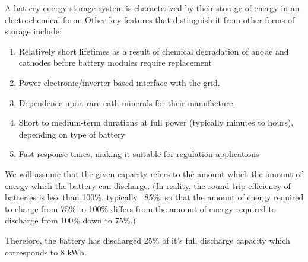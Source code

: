 \documentclass{homework}
\begin{document}
\begin{letterenum}
    \item A battery energy storage system is characterized by their storage
        of energy in an electrochemical form. Other key features that 
        distinguish it from other forms of storage include:
        \begin{enumerate}
            \item Relatively short lifetimes as a result of chemical degradation
                of anode and cathodes before battery modules require replacement
            \item Power electronic/inverter-based interface with the grid.
            \item Dependence upon rare eath minerals for their manufacture.
            \item Short to medium-term durations at full power
                (typically minutes to hours), depending on type of battery
            \item Fast response times, making it suitable for regulation applications
        \end{enumerate}
    \item We will assume that the given capacity refers to the amount which the
        amount of energy which the battery can discharge. (In reality, the round-trip
        efficiency of batteries is less than 100\%, typically ~85\%, so that the
        amount of energy required to charge from 75\% to 100\% differs from the
        amount of energy required to discharge from 100\% down to 75\%.)

        Therefore, the battery has discharged 25\% of it's full discharge capacity
        which corresponds to 8 kWh.
\end{letterenum}
\end{document}

